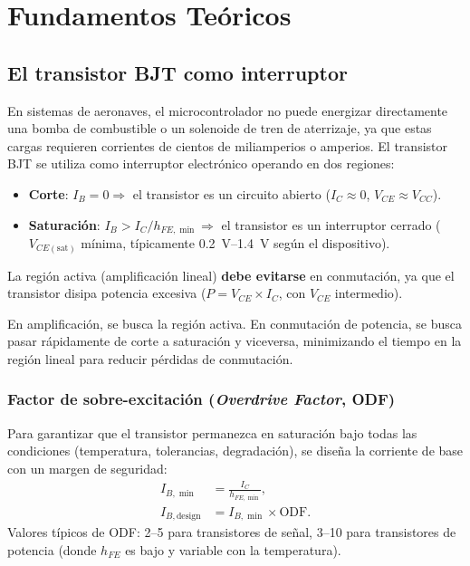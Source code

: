 \documentclass[11pt]{article}
\begin{document}
\section{Fundamentos Teóricos}

\subsection{El transistor BJT como interruptor}
En sistemas de aeronaves, el microcontrolador no puede energizar directamente una bomba
de combustible o un solenoide de tren de aterrizaje, ya que estas cargas requieren
corrientes de cientos de miliamperios o amperios. El transistor BJT se utiliza como
interruptor electrónico operando en dos regiones:
\begin{itemize}
  \item \textbf{Corte}: $I_B=0 \Rightarrow$ el transistor es un circuito abierto
        ($I_C\approx 0$, $V_{CE}\approx V_{CC}$).
  \item \textbf{Saturación}: $I_B > I_C/h_{FE,\min} \Rightarrow$ el transistor es un
        interruptor cerrado ($V_{CE(\text{sat})}$ mínima, típicamente
        \SIrange{0.2}{1.4}{\volt} según el dispositivo).
\end{itemize}
La región activa (amplificación lineal) \textbf{debe evitarse} en conmutación, ya que el
transistor disipa potencia excesiva ($P=V_{CE}\times I_C$, con $V_{CE}$ intermedio).

\begin{nota}
En amplificación, se busca la región activa. En conmutación de potencia, se busca pasar
rápidamente de corte a saturación y viceversa, minimizando el tiempo en la región lineal
para reducir pérdidas de conmutación.
\end{nota}

\subsubsection{Factor de sobre-excitación (\emph{Overdrive Factor}, ODF)}
Para garantizar que el transistor permanezca en saturación bajo todas las condiciones
(temperatura, tolerancias, degradación), se diseña la corriente de base con un margen de
seguridad:
\begin{align}
  I_{B,\min} &= \frac{I_C}{h_{FE,\min}}, \\
  I_{B,\text{design}} &= I_{B,\min}\times\text{ODF}.
\end{align}
Valores típicos de ODF: 2--5 para transistores de señal, 3--10 para transistores de
potencia (donde $h_{FE}$ es bajo y variable con la temperatura).
\end{document}
